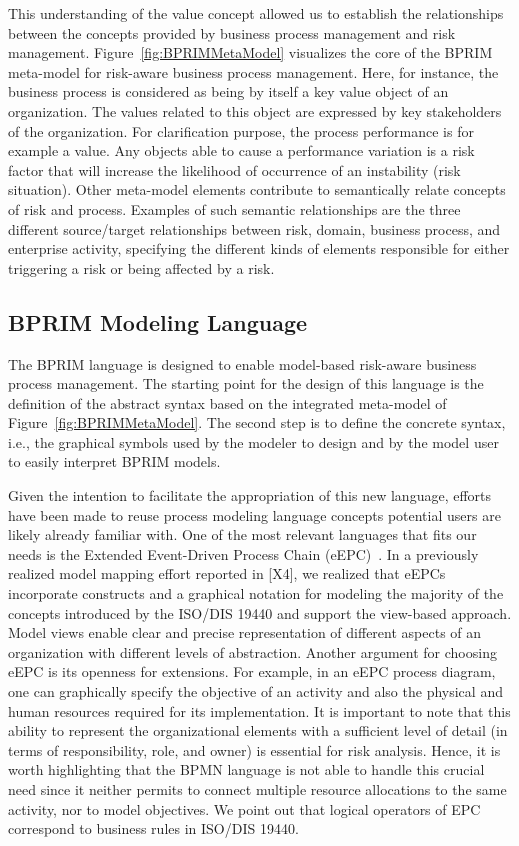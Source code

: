 \documentclass[preprint,3p,times,number]{elsarticle}
\begin{document}
This understanding of the value concept allowed us to establish the relationships between the concepts provided by business process management and risk management. Figure~\ref{fig:BPRIMMetaModel} visualizes the core of the BPRIM meta-model for risk-aware business process management. Here, for instance, the business process is considered as being by itself a key value object of an organization. The values related to this object are expressed by key stakeholders of the organization. For clarification purpose, the process performance is for example a value. Any objects able to cause a performance variation is a risk factor that will increase the likelihood of occurrence of an instability (risk situation). Other meta-model elements contribute to semantically relate concepts of risk and process. Examples of such semantic relationships are the three different source/target relationships between risk, domain, business process, and enterprise activity, specifying the different kinds of elements responsible for either triggering a risk or being affected by a risk.

\subsection{BPRIM Modeling Language}
\label{sec:bprim:modelinglanguage}
The BPRIM language is designed to enable model-based risk-aware business process management. The starting point for the design of this language is the definition of the abstract syntax based on the integrated meta-model of Figure~\ref{fig:BPRIMMetaModel}. The second step is to define the concrete syntax, i.e., the graphical symbols used by the modeler to design and by the model user to easily interpret BPRIM models.

Given the intention to facilitate the appropriation of this new language, efforts have been made to reuse process modeling language concepts potential users are likely already familiar with. One of the most relevant languages that fits our needs is the Extended Event-Driven Process Chain (eEPC)~\cite{davis2007}. In a previously realized model mapping effort reported in [X4], %
we realized that eEPCs incorporate constructs and a graphical notation for modeling the majority of the concepts introduced by the ISO/DIS 19440 and support the view-based approach. Model views enable clear and precise representation of different aspects of an organization with different levels of abstraction. Another argument for choosing eEPC is its openness for extensions. For example, in an eEPC process diagram, one can graphically specify the objective of an activity and also the physical and human resources required for its implementation. It is important to note that this ability to represent the organizational elements with a sufficient level of detail (in terms of responsibility, role, and owner) is essential for risk analysis. Hence, it is worth highlighting that the BPMN language is not able to handle this crucial need since it neither permits to connect multiple resource allocations to the same activity, nor to model objectives. We point out that logical operators of EPC correspond to business rules in ISO/DIS 19440.
\end{document}
